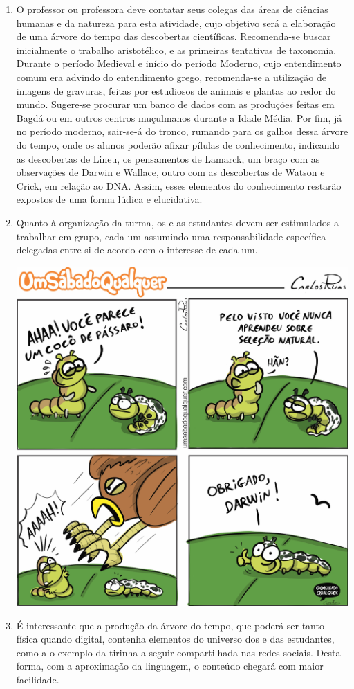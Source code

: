 \documentclass[11pt]{extarticle}
\begin{document}
\begin{enumerate}

	\item
	O professor ou professora deve contatar seus colegas das áreas de ciências
	humanas e da natureza para esta atividade, cujo objetivo será a elaboração
	de uma árvore do tempo das descobertas científicas.
	Recomenda-se buscar inicialmente o trabalho	aristotélico, e as primeiras tentativas 
	de taxonomia. Durante o período Medieval e início do período Moderno, cujo entendimento comum era advindo do
	entendimento grego, recomenda-se a utilização de imagens de gravuras, feitas
	por estudiosos de animais e plantas ao redor do mundo. Sugere-se procurar um
	banco de dados com as produções feitas em Bagdá ou em outros centros muçulmanos
	durante a Idade Média.
	Por fim, já no período moderno, sair-se-á do tronco, rumando para os galhos
	dessa árvore do tempo, onde os alunos poderão afixar pílulas de conhecimento,
	indicando as descobertas de Lineu, os pensamentos de Lamarck, um braço com as
	observações de Darwin e Wallace, outro com as descobertas de Watson e Crick, em
	relação ao DNA. Assim, esses elementos do conhecimento restarão expostos de uma forma lúdica
	e elucidativa.

	\item
	Quanto à organização da turma, os e as estudantes devem ser estimulados a trabalhar
	em grupo, cada um assumindo uma responsabilidade específica delegadas entre si
	de acordo com o interesse de cada um. 

\medskip
\includegraphics[width=.8\textwidth]{./images/PNLD0060-11}

	\item
	É interessante que a produção da árvore do tempo, que poderá ser tanto física
	quando digital, contenha elementos do universo dos e das estudantes, como 
	a o exemplo da tirinha a seguir compartilhada nas redes sociais. Desta forma,
	com a aproximação da linguagem, o conteúdo chegará com maior facilidade. 


\end{enumerate}
\end{document}
